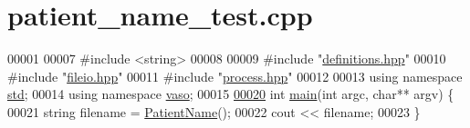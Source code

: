 \hypertarget{patient__name__test_8cpp_source}{\section{patient\+\_\+name\+\_\+test.\+cpp}
\label{patient__name__test_8cpp_source}
}

\begin{DoxyCode}
00001 
00007 \textcolor{preprocessor}{#include <string>}
00008 
00009 \textcolor{preprocessor}{#include "\hyperlink{definitions_8hpp}{definitions.hpp}"}
00010 \textcolor{preprocessor}{#include "\hyperlink{fileio_8hpp}{fileio.hpp}"}
00011 \textcolor{preprocessor}{#include "\hyperlink{process_8hpp}{process.hpp}"}
00012 
00013 \textcolor{keyword}{using namespace }\hyperlink{namespacestd}{std};
00014 \textcolor{keyword}{using namespace }\hyperlink{namespacevaso}{vaso};
00015 
\hypertarget{patient__name__test_8cpp_source_l00020}{}\hyperlink{patient__name__test_8cpp_a3c04138a5bfe5d72780bb7e82a18e627}{00020} \textcolor{keywordtype}{int} \hyperlink{patient__name__test_8cpp_a3c04138a5bfe5d72780bb7e82a18e627}{main}(\textcolor{keywordtype}{int} argc, \textcolor{keywordtype}{char}** argv) \{
00021     \textcolor{keywordtype}{string} filename = \hyperlink{namespacevaso_a21e264fa912f7ca3f50e7e412ba1582e}{PatientName}();
00022     cout << filename;
00023 \}
\end{DoxyCode}
